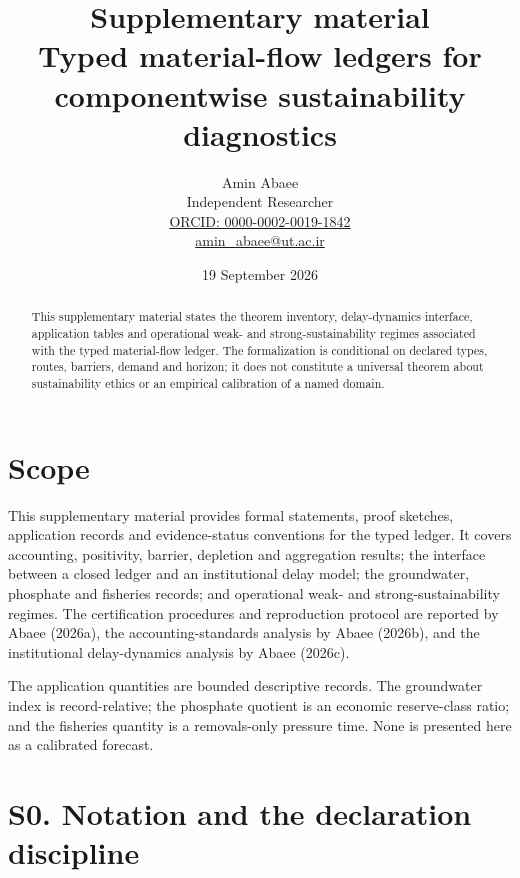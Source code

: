 \documentclass[11pt]{article}
\begin{document}
\title{Supplementary material\\
\large Typed material-flow ledgers for componentwise sustainability diagnostics}
\author{Amin Abaee\\[0.25em]
{\small Independent Researcher}\\[0.25em]
{\small\href{https://orcid.org/0000-0002-0019-1842}{ORCID: 0000-0002-0019-1842}}\\[0.25em]
{\small\href{mailto:amin\_abaee@ut.ac.ir}{amin\_abaee@ut.ac.ir}}}
\date{19 September 2026}
\maketitle

\begin{abstract}
This supplementary material states the theorem inventory, delay-dynamics interface, application tables and operational weak- and strong-sustainability regimes associated with the typed material-flow ledger. The formalization is conditional on declared types, routes, barriers, demand and horizon; it does not constitute a universal theorem about sustainability ethics or an empirical calibration of a named domain.
\end{abstract}

\section*{Scope}

This supplementary material provides formal statements, proof sketches, application records and evidence-status conventions for the typed ledger. It covers accounting, positivity, barrier, depletion and aggregation results; the interface between a closed ledger and an institutional delay model; the groundwater, phosphate and fisheries records; and operational weak- and strong-sustainability regimes. The certification procedures and reproduction protocol are reported by Abaee (2026a), the accounting-standards analysis by Abaee (2026b), and the institutional delay-dynamics analysis by Abaee (2026c).

The application quantities are bounded descriptive records. The groundwater index is record-relative; the phosphate quotient is an economic reserve-class ratio; and the fisheries quantity is a removals-only pressure time. None is presented here as a calibrated forecast.

\section*{S0. Notation and the declaration discipline}
\end{document}
